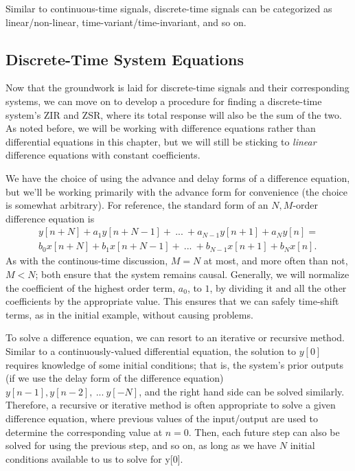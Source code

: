 \documentclass{article}
\begin{document}
Similar to continuous-time signals, discrete-time signals can be categorized as linear/non-linear, time-variant/time-invariant, and so on.

\subsection{Discrete-Time System Equations}
Now that the groundwork is laid for discrete-time signals and their corresponding systems, we can move on to develop a procedure for finding a discrete-time system's ZIR and ZSR, where its total response will also be the sum of the two. As noted before, we will be working with difference equations rather than differential equations in this chapter, but we will still be sticking to \textit{linear} difference equations with constant coefficients.

We have the choice of using the advance and delay forms of a difference equation, but we'll be working primarily with the advance form for convenience (the choice is somewhat arbitrary). For reference, the standard form of an \(N,M\)-order difference equation is 
\begin{align*}
	y[n+N] + a_1y[n+N-1]+ \ ... \ + a_{N-1}y[n+1] + a_Ny[n] = \\
	b_0x[n+N] + b_1x[n+N-1] + \ ... \ +b_{N-1}x[n+1] + b_Nx[n].
\end{align*}
As with the continous-time discussion, \(M=N\) at most, and more often than not, \(M < N\); both ensure that the system remains causal. Generally, we will normalize the coefficient of the highest order term, \(a_0\), to \(1\), by dividing it and all the other coefficients by the appropriate value. This ensures that we can safely time-shift terms, as in the initial example, without causing problems.

To solve a difference equation, we can resort to an iterative or recursive method. Similar to a continuously-valued differential equation, the solution to \(y[0]\) requires knowledge of some initial conditions; that is, the system's prior outputs (if we use the delay form of the difference equation) \(y[n-1], y[n-2], \ ... \ y[-N]\), and the right hand side can be solved similarly. Therefore, a recursive or iterative method is often appropriate to solve a given difference equation, where previous values of the input/output are used to determine the corresponding value at \(n=0\). Then, each future step can also be solved for using the previous step, and so on, as long as we have \(N\) initial conditions available to us to solve for y[0].
\end{document}

